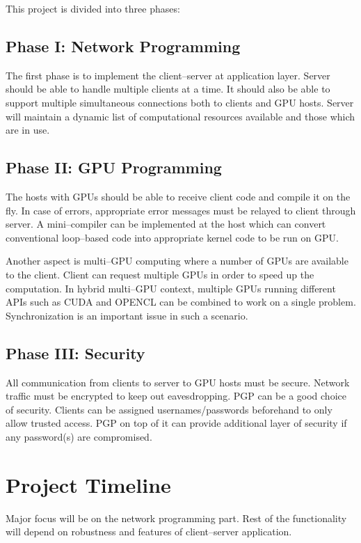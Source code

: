 \documentclass[11pt,a4paper]{article}
\begin{document}
This project is divided into three phases:

\subsection{Phase I: Network Programming}
The first phase is to implement the client--server at application layer. Server should be able to handle multiple clients at a time. It should also be able to support multiple simultaneous connections both to clients and GPU hosts. Server will maintain a dynamic list of computational resources available and those which are in use.

\subsection{Phase II: GPU Programming}
The hosts with GPUs should be able to receive client code and compile it on the fly. In case of errors, appropriate error messages must be relayed to client through server. A mini--compiler can be implemented at the host which can convert conventional loop--based code into appropriate kernel code to be run on GPU. 

Another aspect is multi--GPU computing where a number of GPUs are available to the client. Client can request multiple GPUs in order to speed up the computation. In hybrid multi--GPU context, multiple GPUs running different APIs such as CUDA and OPENCL can be combined to work on a single problem. Synchronization is an important issue in such a scenario.

\subsection{Phase III: Security}
All communication from clients to server to GPU hosts must be secure. Network traffic must be encrypted to keep out eavesdropping. PGP can be a good choice of security. Clients can be assigned usernames/passwords beforehand to only allow trusted access. PGP on top of it can provide additional layer of security if any password(s) are compromised.

\section{Project Timeline}

Major focus will be on the network programming part. Rest of the functionality will depend on robustness and features of client--server application.
\end{document}
